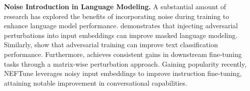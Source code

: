 \textbf{Noise Introduction in Language Modeling.} A substantial amount of research has explored the benefits of incorporating noise during training to enhance language model performance. \citep{zhu2020freelbenhancedadversarialtraining} demonstrates that injecting adversarial perturbations into input embeddings can improve masked language modeling. Similarly, \citep{miyato2021adversarialtrainingmethodssemisupervised} show that adversarial training can improve text classification performance. Furthermore, \citep{wu2022noisytunelittlenoisehelp} achieves consistent gains in downstream fine-tuning tasks through a matrix-wise perturbation approach. Gaining popularity recently, NEFTune \citep{jain2023neftunenoisyembeddingsimprove} leverages noisy input embeddings to improve instruction fine-tuning, attaining notable improvement in conversational capabilities. 


